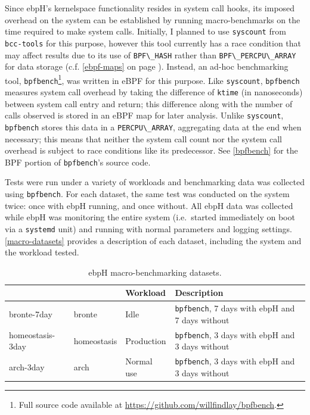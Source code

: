 \documentclass[
  12pt]{findlay}
\newcommand{\passthrough}[1]{#1}
\begin{document}
Since ebpH's kernelspace functionality resides in system call hooks, its
imposed overhead on the system can be established by running
macro-benchmarks on the time required to make system calls. Initially, I
planned to use \passthrough{\lstinline!syscount!} \autocite{syscount}
from \passthrough{\lstinline!bcc-tools!} for this purpose, however this
tool currently has a race condition that may affect results due to its
use of \passthrough{\lstinline!BPF\_HASH!} rather than
\passthrough{\lstinline!BPF\_PERCPU\_ARRAY!} for data storage (c.f.
\autoref{ebpf-maps} on page \pageref{ebpf-maps}). Instead, an ad-hoc
benchmarking tool,
\passthrough{\lstinline!bpfbench!}\footnote{Full source code available at
\url{https://github.com/willfindlay/bpfbench}.}, was written in eBPF for
this purpose. Like \texttt{syscount}, \passthrough{\lstinline!bpfbench!}
measures system call overhead by taking the difference of
\passthrough{\lstinline!ktime!} (in nanoseconds) between system call
entry and return; this difference along with the number of calls
observed is stored in an eBPF map for later analysis. Unlike
\passthrough{\lstinline!syscount!}, \passthrough{\lstinline!bpfbench!}
stores this data in a \passthrough{\lstinline!PERCPU\_ARRAY!},
aggregating data at the end when necessary; this means that neither the
system call count nor the system call overhead is subject to race
conditions like its predecessor. See \autoref{bpfbench} for the BPF
portion of \passthrough{\lstinline!bpfbench!}'s source code.

Tests were run under a variety of workloads and benchmarking data was
collected using \passthrough{\lstinline!bpfbench!}. For each dataset,
the same test was conducted on the system twice: once with ebpH running,
and once without. All ebpH data was collected while ebpH was monitoring
the entire system (i.e.~started immediately on boot via a
\passthrough{\lstinline!systemd!} unit) and running with normal
parameters and logging settings. \autoref{macro-datasets} provides a
description of each dataset, including the system and the workload
tested.

\begin{table}
    \caption[ebpH macro-benchmarking datasets]{
        ebpH macro-benchmarking datasets.
    }
    \label{macro-datasets}
    \begin{tabular}{>{\ttfamily}l>{\ttfamily}llp{2.3in}}
        \toprule
        \multicolumn{1}{l}{Dataset} & \multicolumn{1}{l}{System} & Workload & Description \\
        \midrule
        bronte-7day & bronte & Idle & \texttt{bpfbench}, 7 days with ebpH and 7 days without \\
        homeostasis-3day & homeostasis & Production & \texttt{bpfbench}, 3 days with ebpH and 3 days without \\
        arch-3day & arch & Normal use & \texttt{bpfbench}, 3 days with ebpH and 3 days without \\
        \bottomrule
    \end{tabular}
\end{table}
\end{document}
